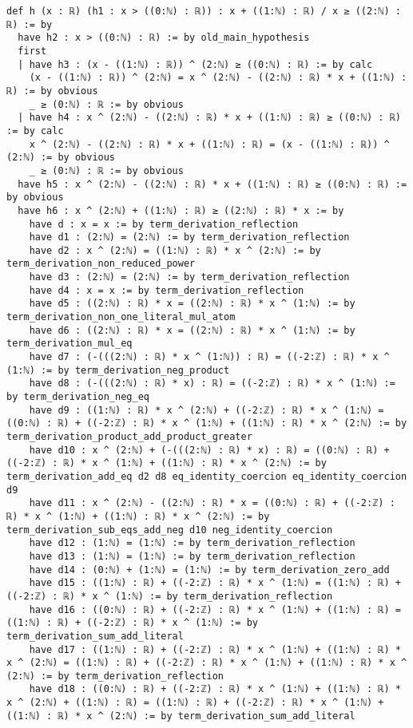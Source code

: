 \documentclass{article}
\begin{document}
\begin{tcolorbox}[colback=white!10, width=\linewidth]
\begin{lstlisting}[language=Lean4]
def h (x : ℝ) (h1 : x > ((0:ℕ) : ℝ)) : x + ((1:ℕ) : ℝ) / x ≥ ((2:ℕ) : ℝ) := by
  have h2 : x > ((0:ℕ) : ℝ) := by old_main_hypothesis
  first
  | have h3 : (x - ((1:ℕ) : ℝ)) ^ (2:ℕ) ≥ ((0:ℕ) : ℝ) := by calc
    (x - ((1:ℕ) : ℝ)) ^ (2:ℕ) = x ^ (2:ℕ) - ((2:ℕ) : ℝ) * x + ((1:ℕ) : ℝ) := by obvious
    _ ≥ (0:ℕ) : ℝ := by obvious
  | have h4 : x ^ (2:ℕ) - ((2:ℕ) : ℝ) * x + ((1:ℕ) : ℝ) ≥ ((0:ℕ) : ℝ) := by calc
    x ^ (2:ℕ) - ((2:ℕ) : ℝ) * x + ((1:ℕ) : ℝ) = (x - ((1:ℕ) : ℝ)) ^ (2:ℕ) := by obvious
    _ ≥ (0:ℕ) : ℝ := by obvious
  have h5 : x ^ (2:ℕ) - ((2:ℕ) : ℝ) * x + ((1:ℕ) : ℝ) ≥ ((0:ℕ) : ℝ) := by obvious
  have h6 : x ^ (2:ℕ) + ((1:ℕ) : ℝ) ≥ ((2:ℕ) : ℝ) * x := by
    have d : x = x := by term_derivation_reflection
    have d1 : (2:ℕ) = (2:ℕ) := by term_derivation_reflection
    have d2 : x ^ (2:ℕ) = ((1:ℕ) : ℝ) * x ^ (2:ℕ) := by term_derivation_non_reduced_power
    have d3 : (2:ℕ) = (2:ℕ) := by term_derivation_reflection
    have d4 : x = x := by term_derivation_reflection
    have d5 : ((2:ℕ) : ℝ) * x = ((2:ℕ) : ℝ) * x ^ (1:ℕ) := by term_derivation_non_one_literal_mul_atom
    have d6 : ((2:ℕ) : ℝ) * x = ((2:ℕ) : ℝ) * x ^ (1:ℕ) := by term_derivation_mul_eq
    have d7 : (-(((2:ℕ) : ℝ) * x ^ (1:ℕ)) : ℝ) = ((-2:ℤ) : ℝ) * x ^ (1:ℕ) := by term_derivation_neg_product
    have d8 : (-(((2:ℕ) : ℝ) * x) : ℝ) = ((-2:ℤ) : ℝ) * x ^ (1:ℕ) := by term_derivation_neg_eq
    have d9 : ((1:ℕ) : ℝ) * x ^ (2:ℕ) + ((-2:ℤ) : ℝ) * x ^ (1:ℕ) = ((0:ℕ) : ℝ) + ((-2:ℤ) : ℝ) * x ^ (1:ℕ) + ((1:ℕ) : ℝ) * x ^ (2:ℕ) := by term_derivation_product_add_product_greater
    have d10 : x ^ (2:ℕ) + (-(((2:ℕ) : ℝ) * x) : ℝ) = ((0:ℕ) : ℝ) + ((-2:ℤ) : ℝ) * x ^ (1:ℕ) + ((1:ℕ) : ℝ) * x ^ (2:ℕ) := by term_derivation_add_eq d2 d8 eq_identity_coercion eq_identity_coercion d9
    have d11 : x ^ (2:ℕ) - ((2:ℕ) : ℝ) * x = ((0:ℕ) : ℝ) + ((-2:ℤ) : ℝ) * x ^ (1:ℕ) + ((1:ℕ) : ℝ) * x ^ (2:ℕ) := by term_derivation_sub_eqs_add_neg d10 neg_identity_coercion
    have d12 : (1:ℕ) = (1:ℕ) := by term_derivation_reflection
    have d13 : (1:ℕ) = (1:ℕ) := by term_derivation_reflection
    have d14 : (0:ℕ) + (1:ℕ) = (1:ℕ) := by term_derivation_zero_add
    have d15 : ((1:ℕ) : ℝ) + ((-2:ℤ) : ℝ) * x ^ (1:ℕ) = ((1:ℕ) : ℝ) + ((-2:ℤ) : ℝ) * x ^ (1:ℕ) := by term_derivation_reflection
    have d16 : ((0:ℕ) : ℝ) + ((-2:ℤ) : ℝ) * x ^ (1:ℕ) + ((1:ℕ) : ℝ) = ((1:ℕ) : ℝ) + ((-2:ℤ) : ℝ) * x ^ (1:ℕ) := by term_derivation_sum_add_literal
    have d17 : ((1:ℕ) : ℝ) + ((-2:ℤ) : ℝ) * x ^ (1:ℕ) + ((1:ℕ) : ℝ) * x ^ (2:ℕ) = ((1:ℕ) : ℝ) + ((-2:ℤ) : ℝ) * x ^ (1:ℕ) + ((1:ℕ) : ℝ) * x ^ (2:ℕ) := by term_derivation_reflection
    have d18 : ((0:ℕ) : ℝ) + ((-2:ℤ) : ℝ) * x ^ (1:ℕ) + ((1:ℕ) : ℝ) * x ^ (2:ℕ) + ((1:ℕ) : ℝ) = ((1:ℕ) : ℝ) + ((-2:ℤ) : ℝ) * x ^ (1:ℕ) + ((1:ℕ) : ℝ) * x ^ (2:ℕ) := by term_derivation_sum_add_literal

\end{lstlisting}
\end{tcolorbox}
\end{document}
